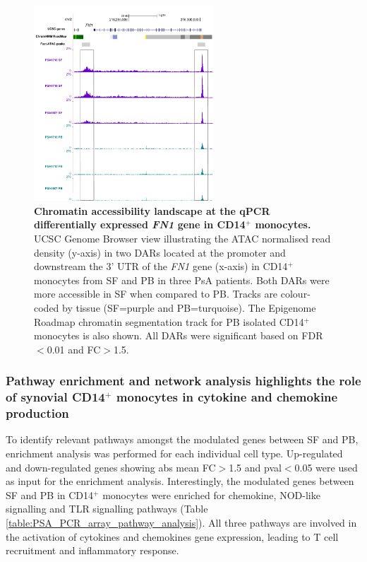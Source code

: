\begin{figure}[htbp]
\centering
\includegraphics[width=0.6\textwidth]{./Results3/pdfs/PSA_CD14_ATAC_FN1_paired_gene_expression}
\caption[Chromatin accessibility landscape at the qPCR differentially expressed \textit{FN1} gene in CD14$^+$ monocytes.]{\textbf{Chromatin accessibility landscape at the qPCR differentially expressed \textit{FN1} gene in CD14$^+$ monocytes.} UCSC Genome Browser view illustrating the ATAC normalised read density (y-axis) in two DARs located at the promoter and downstream the 3' UTR of the \textit{FN1} gene (x-axis) in CD14$^+$ monocytes from SF and PB in three PsA patients. Both DARs were more accessible in SF when compared to PB. Tracks are colour-coded by tissue (SF=purple and PB=turquoise). The Epigenome Roadmap chromatin segmentation track for PB isolated CD14$^+$ monocytes is also shown. All DARs were significant based on FDR$<$0.01 and FC$>$1.5.}
\label{figure:PSA_CD14_ATAC_FN1}
\end{figure}


\subsubsection{Pathway enrichment and network analysis highlights the role of synovial CD14$^+$ monocytes in cytokine and chemokine production}
To identify relevant pathways amongst the modulated genes between SF and PB, enrichment analysis was performed for each individual cell type. Up-regulated and down-regulated genes showing abs mean FC$>$1.5 and pval$<$0.05 were used as input for the enrichment analysis. Interestingly, the modulated genes between SF and PB in CD14$^+$ monocytes were enriched for chemokine, NOD-like signalling and TLR signalling pathways (Table \ref{table:PSA_PCR_array_pathway_analysis}). All three pathways are involved in the activation of cytokines and chemokines gene expression, leading to T cell recruitment and inflammatory response. 

